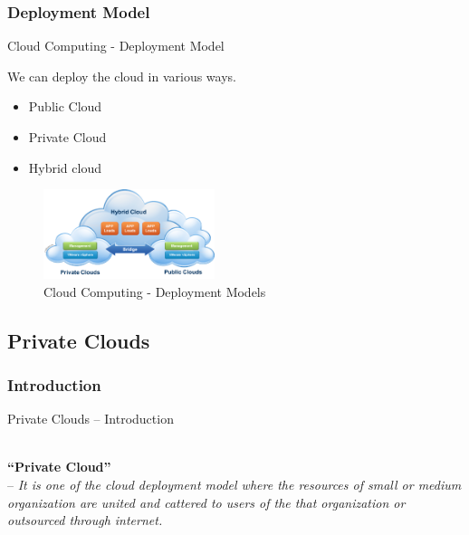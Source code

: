\documentclass[10pt,xcolor=dvipsnames]{beamer}
\begin{document}
\subsubsection{Deployment Model }
\begin{frame}{Cloud Computing - Deployment Model }

We can deploy the cloud in various ways.

\begin{itemize}
\item Public Cloud
\item Private Cloud
\item Hybrid cloud
\end{itemize}

\begin{figure}[H]
 \centering
 \includegraphics[width=5cm]{./model.png}
 \caption{Cloud Computing - Deployment Models \label{fig:model} }
\end{figure}
\end{frame}
\subsection{Private Clouds}
\subsubsection{Introduction}
\begin{frame}{Private Clouds -- Introduction}


\hspace{4cm}\\

\textbf{``Private Cloud''} \\ 
\hspace{16mm} -- \textit{It is one of the cloud deployment model where the resources of small or medium organization are united and cattered to users of the that organization or outsourced through internet.} 

\end{frame}
\end{document}
